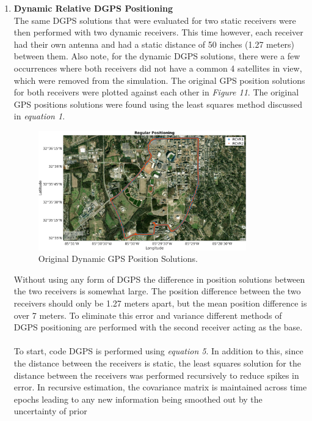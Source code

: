 \documentclass[11pt]{article}
\begin{document}
\begin{enumerate}[label=\textbf{\arabic*.}]
    \item \textbf{Dynamic Relative DGPS Positioning} \\
      The same DGPS solutions that were evaluated for two static receivers were then 
      performed with two dynamic receivers. This time however, each receiver had their own 
      antenna and had a static distance of 50 inches (1.27 meters) between them. Also note, 
      for the dynamic DGPS solutions, there were a few occurrences where both receivers did 
      not have a common 4 satellites in view, which were removed from the simulation. The 
      original GPS position solutions for both receivers were plotted against each other in 
      \emph{Figure 11}. The original GPS positions solutions were found using the least 
      squares method discussed in \emph{equation 1}. 
      \begin{figure}[H]
        \centering
        \includegraphics[width=0.85\textwidth]{p3_a.png}
        \caption{Original Dynamic GPS Position Solutions.}
      \end{figure}
      Without using any form of DGPS the difference in position solutions between the two 
      receivers is somewhat large. The position difference between the two receivers should 
      only be 1.27 meters apart, but the mean position difference is over 7 meters. To 
      eliminate this error and variance different methods of DGPS positioning are performed 
      with the second receiver acting as the base. 
      \\ \\
      To start, code DGPS is performed using \emph{equation 5}. In addition to this, since 
      the distance between the receivers is static, the least squares solution for the 
      distance between the receivers was performed recursively to reduce spikes in error. 
      In recursive estimation, the covariance matrix is maintained across time epochs 
      leading to any new information being smoothed out by the uncertainty of prior 

\end{enumerate}
\end{document}
